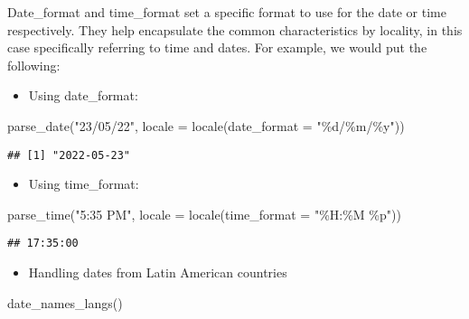 \documentclass[
]{article}
\newenvironment{Shaded}{\begin{snugshade}}{\end{snugshade}}
\newcommand{\AttributeTok}[1]{\textcolor[rgb]{0.77,0.63,0.00}{#1}}
\newcommand{\FunctionTok}[1]{\textcolor[rgb]{0.00,0.00,0.00}{#1}}
\newcommand{\NormalTok}[1]{#1}
\newcommand{\StringTok}[1]{\textcolor[rgb]{0.31,0.60,0.02}{#1}}
\providecommand{\tightlist}{%
  \setlength{\itemsep}{0pt}\setlength{\parskip}{0pt}}
\begin{document}
Date\_format and time\_format set a specific format to use for the date
or time respectively. They help encapsulate the common characteristics
by locality, in this case specifically referring to time and dates. For
example, we would put the following:

\begin{itemize}
\tightlist
\item
  Using date\_format:
\end{itemize}

\begin{Shaded}
\begin{Highlighting}[]
\FunctionTok{parse\_date}\NormalTok{(}\StringTok{"23/05/22"}\NormalTok{, }\AttributeTok{locale =} \FunctionTok{locale}\NormalTok{(}\AttributeTok{date\_format =} \StringTok{"\%d/\%m/\%y"}\NormalTok{))}
\end{Highlighting}
\end{Shaded}

\begin{verbatim}
## [1] "2022-05-23"
\end{verbatim}

\begin{itemize}
\tightlist
\item
  Using time\_format:
\end{itemize}

\begin{Shaded}
\begin{Highlighting}[]
\FunctionTok{parse\_time}\NormalTok{(}\StringTok{"5:35 PM"}\NormalTok{, }\AttributeTok{locale =} \FunctionTok{locale}\NormalTok{(}\AttributeTok{time\_format =} \StringTok{"\%H:\%M \%p"}\NormalTok{))}
\end{Highlighting}
\end{Shaded}

\begin{verbatim}
## 17:35:00
\end{verbatim}

\begin{itemize}
\tightlist
\item
  Handling dates from Latin American countries
\end{itemize}

\begin{Shaded}
\begin{Highlighting}[]
\FunctionTok{date\_names\_langs}\NormalTok{()}
\end{Highlighting}
\end{Shaded}
\end{document}
